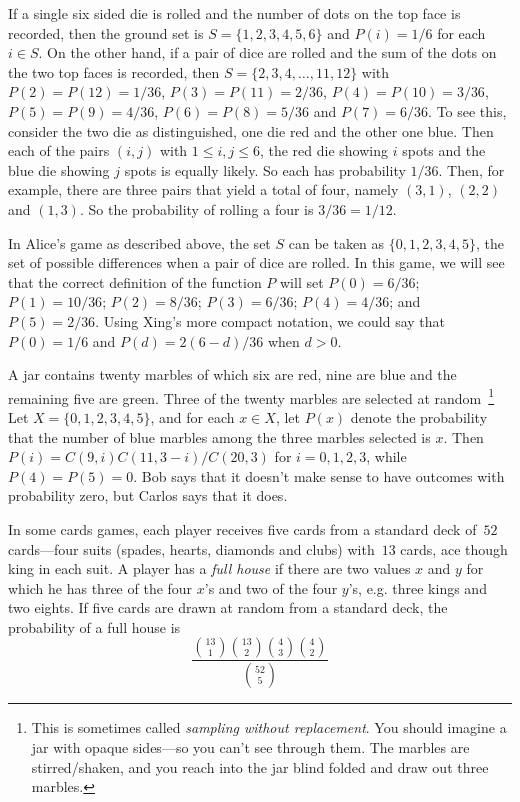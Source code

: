 \begin{example}
If a single six sided die is rolled and the number of dots on the
top face is recorded, then the ground set is $S=\{1,2,3,4,5,6\}$ and
$P(i)=1/6$ for each $i\in S$.  On the other hand, if a pair of dice
are rolled and the sum of the dots on the two top faces is recorded,
then $S=\{2,3,4,\dots,11,12\}$ with $P(2)=P(12) =1/36$, $P(3)=P(11)=2/36$,
$P(4)=P(10)=3/36$, $P(5)=P(9)=4/36$, $P(6)=P(8)=5/36$ and $P(7)=6/36$.
To see this, consider the two die as distinguished, one die red and the
other one blue.  Then each of the pairs $(i,j)$ with $1\le i,j\le 6$, 
the red die showing $i$ spots and the blue die showing $j$ spots is
equally likely.  So each has probability $1/36$.  Then, for example,
there are three pairs that yield a total of four, namely $(3,1)$, $(2,2)$
and $(1,3)$.  So the probability of rolling a four is $3/36=1/12$.
\end{example}

\begin{example}
In Alice's game as described above, the set $S$ can be taken
as $\{0,1,2,3,4,5\}$, the set of possible differences when a pair
of dice are rolled.  In this game, we will see that the correct
definition of the function $P$ will set $P(0)=6/36$; $P(1)=10/36$;
$P(2)=8/36$; $P(3)=6/36$; $P(4)=4/36$; and $P(5)=2/36$.  Using
Xing's more compact notation, we could say that $P(0)=1/6$ and
$P(d)= 2(6-d)/36$ when $d>0$.
\end{example}

\begin{example}
A jar contains twenty marbles of which six are red, nine are blue
and the remaining five are green.  Three of the twenty marbles are
selected at random~\footnote{This is sometimes called \textit{sampling
without replacement}.  You should imagine a jar with opaque sides---so
you can't see through them.  The marbles are stirred/shaken, and you
reach into the jar blind folded and draw out three marbles.}
Let $X=\{0,1,2,3,4,5\}$, and for each $x\in X$,
let $P(x)$ denote the probability that the number of blue
marbles among  the three marbles selected is $x$.  Then
$P(i)=C(9,i)C(11,3-i)/C(20,3)$ for $i=0,1,2,3$, while
$P(4)=P(5)=0$.  Bob says that it doesn't make sense to have
outcomes with probability zero, but Carlos says that it does.
\end{example}

\begin{example}
In some cards games, each player receives five cards from a
standard deck of~$52$ cards---four suits (spades, hearts, diamonds
and clubs) with~$13$ cards, ace though king in each suit.  A player 
has a \textit{full house} if there are two values $x$ and $y$ for
which he has three of the four $x$'s and two of the four $y$'s, e.g.
three kings and two eights.  If five cards are drawn at random from
a standard deck, the probability of a full house is 
\[
\frac{\binom{13}{1}\binom{13}{2}\binom{4}{3}\binom{4}{2}}{\binom{52}{5}}
\]
\end{example}

